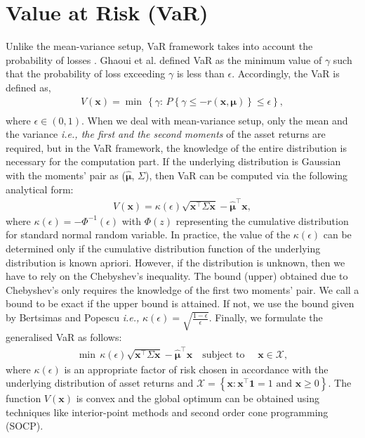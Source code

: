 \section{Value at Risk (VaR)}
Unlike the mean-variance setup, VaR framework takes into account the probability of losses \cite{var96}. Ghaoui et al. \cite{ghaoui03} defined VaR as the minimum value of $\gamma$ such that the probability of loss exceeding $\gamma$ is less than $\epsilon$. Accordingly, the VaR is defined as,
\begin{equation}
\begin{split}
V(\mathbf{x}) = \min \, \left\{ \gamma :  \, P\left\{\gamma \leq -r(\mathbf{x},\boldsymbol{\mu})\right\} \leq \epsilon \right\},  \\
\end{split}
\label{fig:var_basic}
\end{equation}
where $\epsilon \in (0,1)$. When we deal with mean-variance setup, only the mean and the variance \textit{i.e., the first and the second moments} of the asset returns are required, but in the VaR framework, the knowledge of the entire distribution is necessary for the computation part. If the underlying distribution is Gaussian with the moments' pair as ($\hat{\boldsymbol{\mu}}$, $\Sigma$), then VaR can be computed via the following analytical form:
\begin{equation}
\begin{split}
V(\mathbf{x}) = \kappa(\epsilon)\sqrt{\mathbf{x}^{\top}\Sigma \mathbf{x}} - \hat{\boldsymbol{\mu}}^{\top}\mathbf{x},
\end{split}
\label{eqn:kappa_eqn}
\end{equation}
where $\kappa(\epsilon) = -\Phi^{-1}(\epsilon)$ with $\Phi(z)$ representing the cumulative distribution for standard normal random variable. In practice, the value of the $\kappa(\epsilon)$ can be determined only if the cumulative distribution function of the underlying distribution is known apriori. However, if the distribution is unknown, then we have to rely on the Chebyshev's inequality. The bound (upper) obtained due to Chebyshev's only requires the knowledge of the first two moments' pair. We call a bound to be exact if the upper bound is attained. If not, we use the bound given by Bertsimas and Popescu \cite{bert05} \textit{i.e.,} $\displaystyle{ \kappa(\epsilon) = \sqrt{\frac{1-\epsilon}{\epsilon}}}$. Finally, we formulate the generalised VaR as follows:
\begin{equation}
\begin{split}
\min \, \kappa(\epsilon)\sqrt{\mathbf{x}^{\top}\Sigma \mathbf{x}} - \hat{\boldsymbol{\mu}}^{\top}\mathbf{x} \quad \text{subject to } \quad \mathbf{x} \in \mathcal{X},
\end{split}
\label{fig:var_general}
\end{equation}
where $\kappa(\epsilon)$ is an appropriate factor of risk chosen in accordance with the underlying distribution of asset returns and $\mathcal{X} = \left\{ \mathbf{x} : \mathbf{x}^{\top}\mathbf{1} = 1 \text{ and } \mathbf{x} \geq 0 \right\}$. The function $V(\mathbf{x})$ is convex and the global optimum can be obtained using techniques like interior-point methods and second order cone programming (SOCP).

